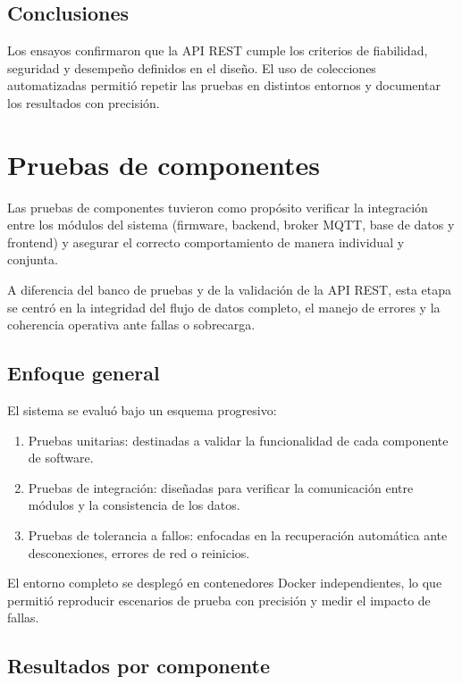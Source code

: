 \subsection{Conclusiones}

Los ensayos confirmaron que la API REST cumple los criterios de fiabilidad, seguridad y desempeño definidos en el diseño.  
El uso de colecciones automatizadas permitió repetir las pruebas en distintos entornos y documentar los resultados con precisión.  

\section{Pruebas de componentes}

Las pruebas de componentes tuvieron como propósito verificar la integración entre los módulos del sistema (firmware, backend, broker MQTT, base de datos y frontend) y asegurar el correcto comportamiento de manera individual y conjunta.  

A diferencia del banco de pruebas y de la validación de la API REST, esta etapa se centró en la integridad del flujo de datos completo, el manejo de errores y la coherencia operativa ante fallas o sobrecarga.

\subsection{Enfoque general}

El sistema se evaluó bajo un esquema progresivo:
\begin{enumerate}
    \item Pruebas unitarias: destinadas a validar la funcionalidad de cada componente de software.
    \item Pruebas de integración: diseñadas para verificar la comunicación entre módulos y la consistencia de los datos.
    \item Pruebas de tolerancia a fallos: enfocadas en la recuperación automática ante desconexiones, errores de red o reinicios.
\end{enumerate}

El entorno completo se desplegó en contenedores Docker independientes, lo que permitió reproducir escenarios de prueba con precisión y medir el impacto de fallas.

\subsection{Resultados por componente}

